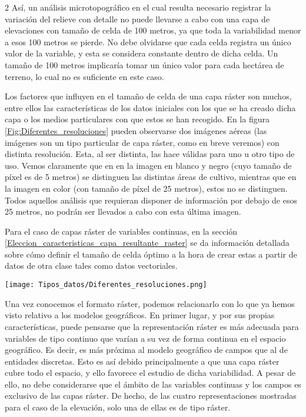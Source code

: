 \begin{multicols}{2}
Así, un análisis microtopográfico en el cual resulta necesario registrar la variación del relieve con detalle no puede llevarse a cabo con una capa de elevaciones con tamaño de celda de 100 metros, ya que toda la variabilidad menor a esos 100 metros se pierde. No debe olvidarse que cada celda registra un único valor de la variable, y esta se considera constante dentro de dicha celda. Un tamaño de 100 metros implicaría tomar un único valor para cada hectárea de terreno, lo cual no es suficiente en este caso.

Los factores que influyen en el tamaño de celda de una capa ráster son muchos, entre ellos las características de los datos iniciales con los que se ha creado dicha capa o los medios particulares con que estos se han recogido. En la figura \ref{Fig:Diferentes_resoluciones} pueden observarse dos imágenes aéreas (las imágenes son un tipo particular de capa ráster, como en breve veremos) con distinta resolución. Esta, al ser distinta, las hace válidas para uno u otro tipo de uso. Vemos claramente que en en la imagen en blanco y negro (cuyo tamaño de píxel es de 5 metros) se distinguen las distintas áreas de cultivo, mientras que en la imagen en color (con tamaño de píxel de 25 metros), estos no se distinguen. Todos aquellos análisis que requieran disponer de información por debajo de esos 25 metros, no podrán ser llevados a cabo con esta última imagen.

Para el caso de capas ráster de variables continuas, en la sección \ref{Eleccion_caracteristicas_capa_resultante_raster} se da información detallada sobre cómo definir el tamaño de celda óptimo a la hora de crear estas a partir de datos de otra clase tales como datos vectoriales.

\begin{figure*}[ht]   
\centering
\texttt{[image: Tipos\_datos/Diferentes\_resoluciones.png]}
\caption{\small Imágenes de diferente resolución en función del sensor con que han sido obtenidas. Al tener distintos tamaños de píxel, servirán para distintos usos dentro de un SIG.}
\label{Fig:Diferentes_resoluciones} 
\end{figure*}

Una vez conocemos el formato ráster, podemos relacionarlo con lo que ya hemos visto relativo a los modelos geográficos. En primer lugar, y por sus propias características, puede pensarse que la representación ráster es más adecuada para variables de tipo continuo que varían a su vez de forma continua en el espacio geográfico. Es decir, es más próxima al modelo geográfico de campos que al de entidades discretas. Esto es así debido principalmente a que una capa ráster cubre todo el espacio, y ello favorece el estudio de dicha variabilidad. A pesar de ello, no debe considerarse que el ámbito de las variables continuas y los campos es exclusivo de las capas ráster. De hecho, de las cuatro representaciones mostradas para el caso de la elevación, solo una de ellas es de tipo ráster.


\end{multicols}
